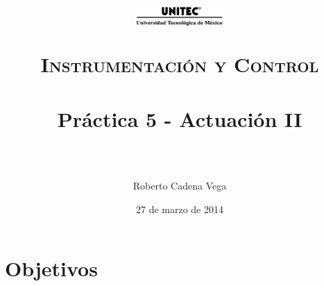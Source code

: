 



\title{	
	\normalfont \normalsize
	\begin{figure}[h]
		\begin{center}
			\includegraphics[width=0.3\textwidth]{../images/UNITEC.png} %
		\end{center}
	\end{figure}
	\textsc{Instrumentación y Control} \\ [25pt]
	\horrule{0.5pt} \\[0.4cm] %
	\huge Práctica 5 - Actuación II \\ %
	\horrule{2pt} \\[0.5cm] %
}

\author{Roberto Cadena Vega} %

\date{\normalsize 27 de marzo de 2014} %




\maketitle %


\section{Objetivos}

